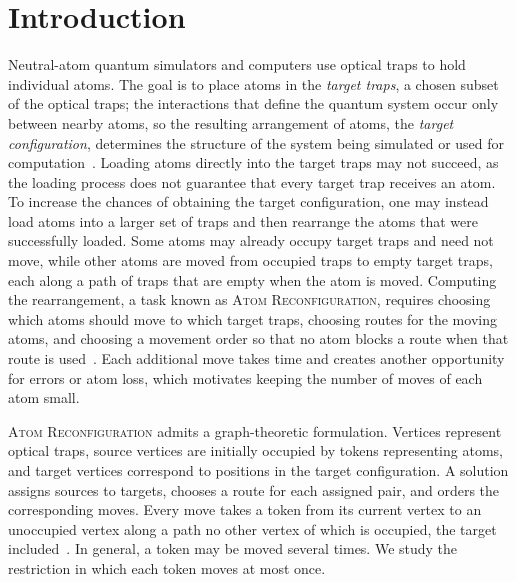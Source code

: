 \documentclass[a4paper,USenglish,thm-restate]{lipics-v2021}
\theoremstyle{problemstyle}
\begin{document}
\section{Introduction}
\label{sec:intro}

Neutral-atom quantum simulators and computers use optical traps to hold
individual atoms. The
goal is to place atoms in the \emph{target traps}, a chosen subset of the
optical traps; the interactions that define the quantum system occur only
between nearby atoms, so the resulting arrangement of atoms, the \emph{target
configuration}, determines the structure of the system being simulated
or used for computation~\cite{Endres2016AtomAssembly,Barredo2016AtomAssembler,%
OhlDeMello2019DefectFree,Schymik2020EnhancedAssembly}. Loading atoms directly
into the target traps may not succeed, as the loading process does not guarantee
that every target trap receives an atom. To increase the chances of obtaining
the target configuration, one may instead load atoms into a larger set of traps
and then rearrange the atoms that were successfully loaded. Some atoms may
already occupy target traps and need not move, while other atoms are moved from
occupied traps to empty target traps, each along a path of traps that are
empty when the atom is moved. Computing the rearrangement, a task known as
\textsc{Atom Reconfiguration}, requires choosing which atoms should move to
which target traps, choosing routes for the moving atoms, and choosing a
movement order so that no atom blocks a route when that route is
used~\cite{Schymik2020EnhancedAssembly,ElSabeh2023ARO,Cimring2023RedRec,%
Afiouni2025BirdBatching}. Each additional move takes time and creates another
opportunity for errors or atom loss, which motivates keeping the number of
moves of each atom small.

\textsc{Atom Reconfiguration} admits a graph-theoretic formulation. Vertices
represent optical traps, source vertices are initially occupied by tokens
representing atoms, and target vertices correspond to positions in the target
configuration. A solution assigns sources to targets, chooses a route for each
assigned pair, and orders the corresponding moves. Every move takes a token from
its current vertex to an unoccupied vertex along a path no other vertex of which
is occupied, the target included~\cite{Calinescu2008Reconfigurations}. In
general, a token may be moved several times. We study the restriction in which
each token moves at most once.
\end{document}
